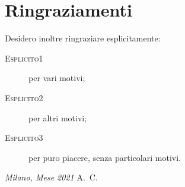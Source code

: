 \cleardoublepage
{}
{}
\chapter*{Ringraziamenti}
\lipsum[1]

\medskip

Desidero inoltre ringraziare esplicitamente:
\begin{description}
\item[{\scshape Esplicito1}] per vari motivi;
\item[{\scshape Esplicito2}] per altri motivi;
\item[{\scshape Esplicito3}] per puro piacere, senza particolari motivi.
\end{description}

\bigskip
 
\noindent\textit{Milano, Mese 2021}
\hfill A.~C.